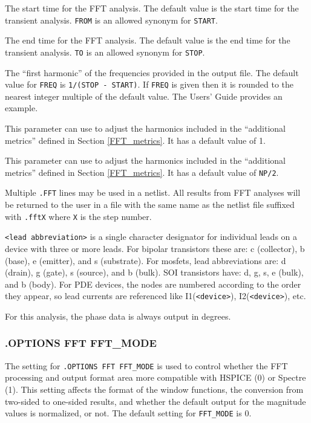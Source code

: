 \begin{Command}
\begin {Arguments}
The start time for the FFT analysis.  The default value is the
start time for the transient analysis. {\tt FROM} is an allowed
synonym for {\tt START}.

The end time for the FFT analysis.  The default value is the
end time for the transient analysis. {\tt TO} is an allowed
synonym for {\tt STOP}.

The ``first harmonic'' of the frequencies provided in the output
file.  The default value for {\tt FREQ} is {\tt 1/(STOP - START)}.
If {\tt FREQ} is given then it is rounded to the nearest integer
multiple of the default value.  The \Xyce{} Users' Guide\UsersGuide
provides an example.

This parameter can use to adjust the harmonics included in the
``additional metrics'' defined in Section \ref{FFT_metrics}.  It
has a default value of 1.

This parameter can use to adjust the harmonics included in the
``additional metrics'' defined in Section \ref{FFT_metrics}.  It
has a default value of \texttt{NP/2}.

\end{Arguments}

\comments
Multiple \texttt{.FFT} lines may be used in a netlist.  All results from FFT analyses
will be returned to the user in a file with the same name as the netlist file suffixed
with \texttt{.fftX} where {\tt X} is the step number.

\texttt{<lead abbreviation>} is a single character designator for individual
leads on a device with three or more leads.  For bipolar transistors these are:
c (collector), b (base), e (emitter), and s (substrate).  For mosfets, lead
abbreviations are: d (drain), g (gate), s (source), and b (bulk).  SOI
transistors have: d, g, s, e (bulk), and b (body).  For PDE devices, the nodes
are numbered according to the order they appear, so lead currents are
referenced like I1(\texttt{<device>}), I2(\texttt{<device>}), etc.

For this analysis, the phase data is always output in degrees.

\end{Command}

\subsubsection{.OPTIONS FFT FFT\_MODE}
\label{FFT_MODE}
The setting for \texttt{.OPTIONS FFT FFT\_MODE} is used to control whether the
\Xyce{} FFT processing and output format area more compatible with HSPICE (0) or
Spectre (1).  This setting affects the format of the window functions, the
conversion from two-sided to one-sided results, and whether the default output
for the magnitude values is normalized, or not.  The default setting for
\texttt{FFT\_MODE} is 0.

